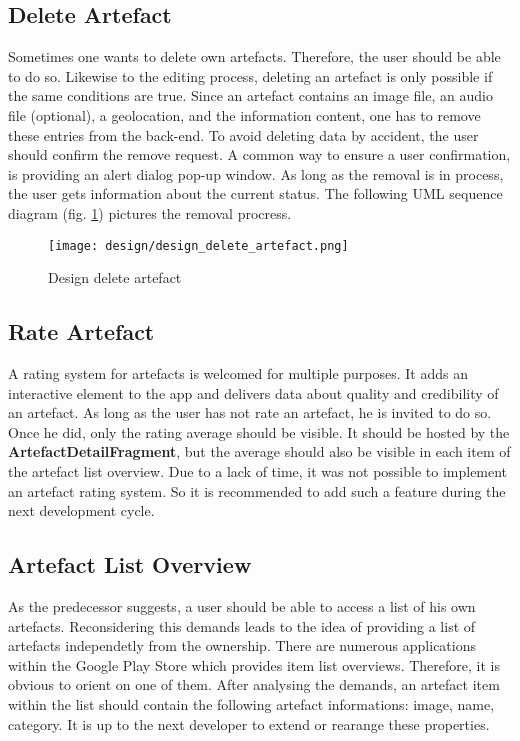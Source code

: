\subsection{Delete Artefact}
Sometimes one wants to delete own artefacts. Therefore, the user should be able to do so. Likewise to the editing process, deleting an artefact is only possible if the same conditions are true. Since an artefact contains an image file, an audio file (optional), a geolocation, and the information content, one has to remove these entries from the back-end. To avoid deleting data by accident, the user should confirm the remove request. A common way to ensure a user confirmation, is providing an alert dialog pop-up window. As long as the removal is in process, the user gets information about the current status. The following UML sequence diagram (fig. \ref{fig:design_delete_artefact}) pictures the removal procress. 

\begin{figure}[H]
	\centering \texttt{[image: design/design\_delete\_artefact.png]}
	\caption[Design delete artefact]{Design delete artefact}	
	\label{fig:design_delete_artefact}
\end{figure}


\subsection{Rate Artefact}
A rating system for artefacts is welcomed for multiple purposes. It adds an interactive element to the app and delivers data about quality and credibility of an artefact. As long as the user has not rate an artefact, he is invited to do so. Once he did, only the rating average should be visible. It should be hosted by the \textbf{ArtefactDetailFragment}, but the average should also be visible in each item of the artefact list overview.
Due to a lack of time, it was not possible to implement an artefact rating system. So it is recommended to add such a feature during the next development cycle.

\subsection{Artefact List Overview}

As the predecessor suggests, a user should be able to access a list of his own artefacts. Reconsidering this demands leads to the idea of providing a list of artefacts independetly from the ownership. There are numerous applications within the Google Play Store which provides item list overviews. Therefore, it is obvious to orient on one of them. After analysing the demands, an artefact item within the list should contain the following artefact informations: image, name, category. It is up to the next developer to extend or rearange these properties.

